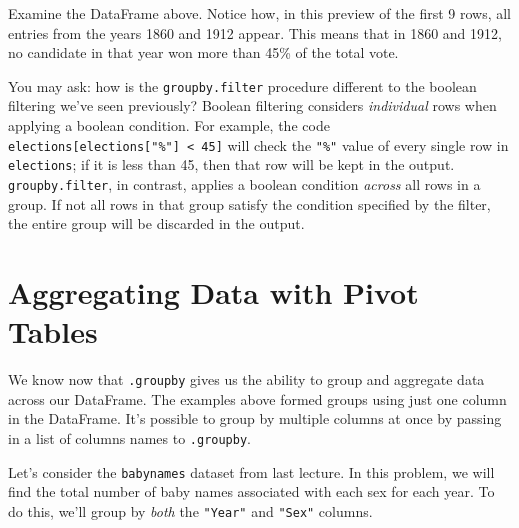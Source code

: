 \documentclass[
  letterpaper,
  DIV=11,
  numbers=noendperiod]{scrreprt}
\begin{document}
Examine the DataFrame above. Notice how, in this preview of the first 9
rows, all entries from the years 1860 and 1912 appear. This means that
in 1860 and 1912, no candidate in that year won more than 45\% of the
total vote.

You may ask: how is the \texttt{groupby.filter} procedure different to
the boolean filtering we've seen previously? Boolean filtering considers
\emph{individual} rows when applying a boolean condition. For example,
the code \texttt{elections{[}elections{[}"\%"{]}\ \textless{}\ 45{]}}
will check the \texttt{"\%"} value of every single row in
\texttt{elections}; if it is less than 45, then that row will be kept in
the output. \texttt{groupby.filter}, in contrast, applies a boolean
condition \emph{across} all rows in a group. If not all rows in that
group satisfy the condition specified by the filter, the entire group
will be discarded in the output.

\hypertarget{aggregating-data-with-pivot-tables}{%
\section{Aggregating Data with Pivot
Tables}\label{aggregating-data-with-pivot-tables}}

We know now that \texttt{.groupby} gives us the ability to group and
aggregate data across our DataFrame. The examples above formed groups
using just one column in the DataFrame. It's possible to group by
multiple columns at once by passing in a list of columns names to
\texttt{.groupby}.

Let's consider the \texttt{babynames} dataset from last lecture. In this
problem, we will find the total number of baby names associated with
each sex for each year. To do this, we'll group by \emph{both} the
\texttt{"Year"} and \texttt{"Sex"} columns.
\end{document}
